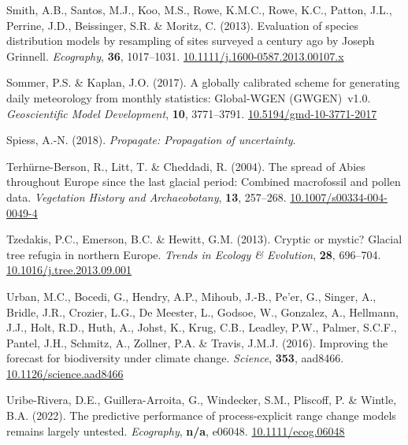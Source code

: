 \documentclass[11pt,]{article}
\newlength{\cslhangindent}
\newenvironment{CSLReferences}[2] %
 {%
  \setlength{\parindent}{0pt}
  \ifodd #1 \everypar{\setlength{\hangindent}{\cslhangindent}}\ignorespaces\fi
  \ifnum #2 > 0
  \setlength{\parskip}{#2\baselineskip}
  \fi
 }%
 {}
\begin{document}
\begin{CSLReferences}{1}{0}
\leavevmode{}%
Smith, A.B., Santos, M.J., Koo, M.S., Rowe, K.M.C., Rowe, K.C., Patton,
J.L., Perrine, J.D., Beissinger, S.R. \& Moritz, C. (2013). Evaluation
of species distribution models by resampling of sites surveyed a century
ago by {Joseph} {Grinnell}. \emph{Ecography}, \textbf{36}, 1017--1031.
\href{https://doi.org/10.1111/j.1600-0587.2013.00107.x}{10.1111/j.1600-0587.2013.00107.x}

\leavevmode{}%
Sommer, P.S. \& Kaplan, J.O. (2017). A globally calibrated scheme for
generating daily meteorology from monthly statistics: Global-WGEN
(GWGEN)~v1.0. \emph{Geoscientific Model Development}, \textbf{10},
3771--3791.
\href{https://doi.org/10.5194/gmd-10-3771-2017}{10.5194/gmd-10-3771-2017}

\leavevmode{}%
Spiess, A.-N. (2018). \emph{Propagate: Propagation of uncertainty}.

\leavevmode{}%
Terhürne-Berson, R., Litt, T. \& Cheddadi, R. (2004). The spread of
{Abies} throughout {Europe} since the last glacial period: Combined
macrofossil and pollen data. \emph{Vegetation History and
Archaeobotany}, \textbf{13}, 257--268.
\href{https://doi.org/10.1007/s00334-004-0049-4}{10.1007/s00334-004-0049-4}

\leavevmode{}%
Tzedakis, P.C., Emerson, B.C. \& Hewitt, G.M. (2013). Cryptic or mystic?
{Glacial} tree refugia in northern {Europe}. \emph{Trends in Ecology \&
Evolution}, \textbf{28}, 696--704.
\href{https://doi.org/10.1016/j.tree.2013.09.001}{10.1016/j.tree.2013.09.001}

\leavevmode{}%
Urban, M.C., Bocedi, G., Hendry, A.P., Mihoub, J.-B., Pe'er, G., Singer,
A., Bridle, J.R., Crozier, L.G., De Meester, L., Godsoe, W., Gonzalez,
A., Hellmann, J.J., Holt, R.D., Huth, A., Johst, K., Krug, C.B.,
Leadley, P.W., Palmer, S.C.F., Pantel, J.H., Schmitz, A., Zollner, P.A.
\& Travis, J.M.J. (2016). Improving the forecast for biodiversity under
climate change. \emph{Science}, \textbf{353}, aad8466.
\href{https://doi.org/10.1126/science.aad8466}{10.1126/science.aad8466}

\leavevmode{}%
Uribe-Rivera, D.E., Guillera-Arroita, G., Windecker, S.M., Pliscoff, P.
\& Wintle, B.A. (2022). The predictive performance of process-explicit
range change models remains largely untested. \emph{Ecography},
\textbf{n/a}, e06048.
\href{https://doi.org/10.1111/ecog.06048}{10.1111/ecog.06048}


\end{CSLReferences}
\end{document}
